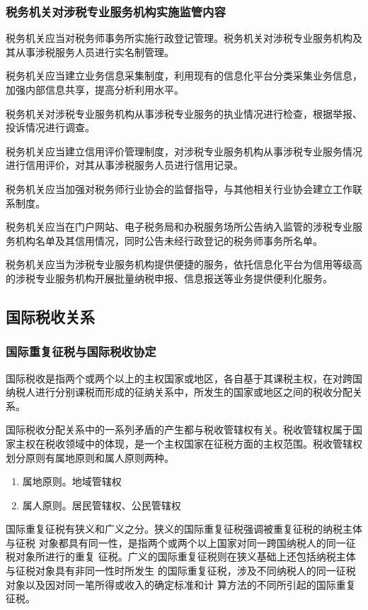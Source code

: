 \documentclass[UTF8,12pt]{ctexart}
\numberwithin{equation}{section} %
\numberwithin{figure}{section}
\numberwithin{table}{section}
\begin{document}
	\subsubsection{税务机关对涉税专业服务机构实施监管内容}
	
	税务机关应当对税务师事务所实施行政登记管理。税务机关对涉税专业服务机构及其从事涉税服务人员进行实名制管理。
	
	税务机关应当建立业务信息采集制度，利用现有的信息化平台分类采集业务信息，加强内部信息共享，提高分析利用水平。
	
	税务机关对涉税专业服务机构从事涉税专业服务的执业情况进行检查，根据举报、投诉情况进行调查。
	
	税务机关应当建立信用评价管理制度，对涉税专业服务机构从事涉税专业服务情况进行信用评价，对其从事涉税服务人员进行信用记录。
	
	税务机关应当加强对税务师行业协会的监督指导，与其他相关行业协会建立工作联系制度。
	
	税务机关应当在门户网站、电子税务局和办税服务场所公告纳入监管的涉税专业服务机构名单及其信用情况，同时公告未经行政登记的税务师事务所名单。
	
	税务机关应当为涉税专业服务机构提供便捷的服务，依托信息化平台为信用等级高的涉税专业服务机构开展批量纳税申报、信息报送等业务提供便利化服务。
	
	\subsection{国际税收关系}
	
	\subsubsection{国际重复征税与国际税收协定}
	国际税收是指两个或两个以上的主权国家或地区，各自基于其课税主权，在对跨国纳税人进行分别课税而形成的征纳关系中，所发生的国家或地区之间的税收分配关系。
	
	国际税收分配关系中的一系列矛盾的产生都与税收管辖权有关。税收管辖权属于国家主权在税收领域中的体现，是一个主权国家在征税方面的主权范围。税收管辖权划分原则有属地原则和属人原则两种。
	\begin{enumerate}
		\item 属地原则。地域管辖权
		
		\item 属人原则。居民管辖权、公民管辖权
	\end{enumerate}
	
	国际重复征税有狭义和广义之分。狭义的国际重复征税强调被重复征税的纳税主体与征税
	对象都具有同一性，是指两个或两个以上国家对同一跨国纳税人的同一征税对象所进行的重复
	征税。广义的国际重复征税则在狭义基础上还包括纳税主体与征税对象具有非同一性时所发生
	的国际重复征税，涉及不同纳税人的同一征税对象以及因对同一笔所得或收入的确定标准和计
	算方法的不同所引起的国际重复征税。
	
\end{document}
